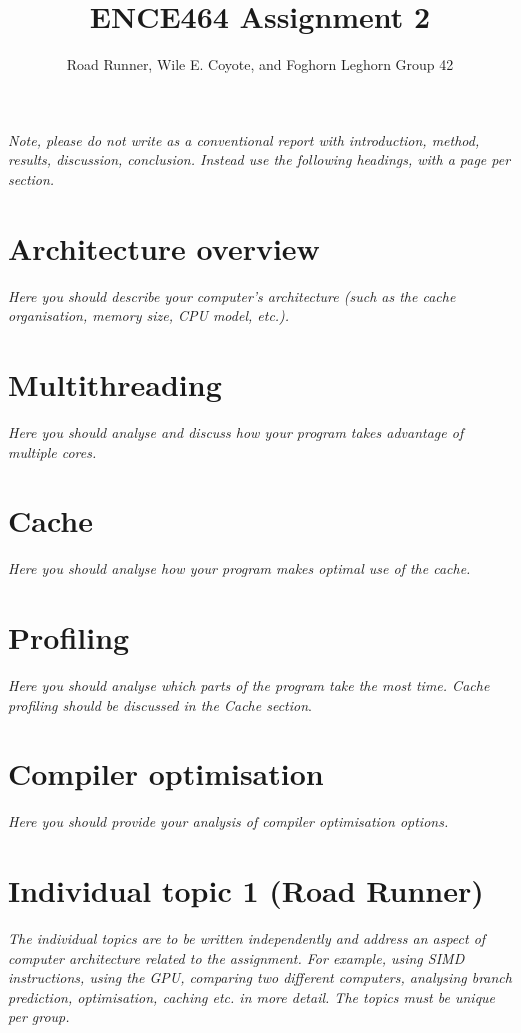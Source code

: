 \documentclass[a4paper,12pt]{article}
\title{ENCE464 Assignment 2}
\author{Road Runner, Wile E. Coyote, and Foghorn Leghorn Group 42}
\date{}
\newcommand{\comment}[1]{\emph{\color{blue}#1}}
\begin{document}
\maketitle

\comment{Note, please do not write as a conventional report with
  introduction, method, results, discussion, conclusion.  Instead use
  the following headings, with a page per section.}


\section{Architecture overview}

\comment{Here you should describe your computer's architecture (such
  as the cache organisation, memory size, CPU model, etc.).}


\section{Multithreading}

\comment{Here you should analyse and discuss how your program takes
  advantage of multiple cores.}


\section{Cache}

\comment{Here you should analyse how your program makes optimal use
  of the cache.}


\section{Profiling}

\comment{Here you should analyse which parts of the program take the
  most time.  Cache profiling should be discussed in the Cache
  section}.


\section{Compiler optimisation}

\comment{Here you should provide your analysis of compiler
  optimisation options.}


\section{Individual topic 1 (Road Runner)}

\comment{The individual topics are to be written independently and
  address an aspect of computer architecture related to the
  assignment.  For example, using SIMD instructions, using the GPU,
  comparing two different computers, analysing branch prediction,
  optimisation, caching etc. in more detail.  The topics must be
  unique per group.}
\end{document}
